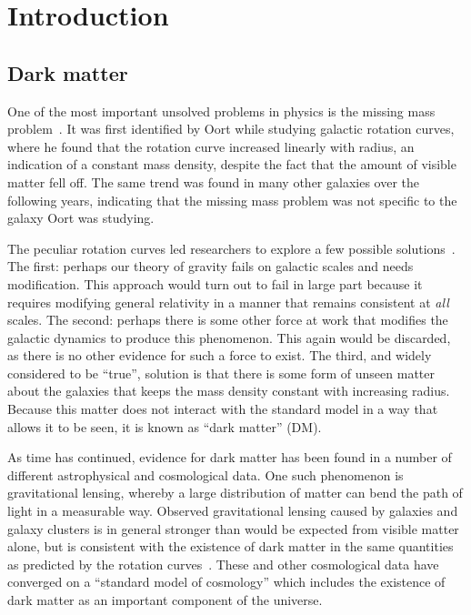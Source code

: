 \chapter{Introduction}
\label{sec:intro}

\section{Dark matter}
One of the most important unsolved problems in physics is the missing mass
problem~\cite{trimble_existence_1987}. It was first identified by Oort while studying galactic rotation
curves, where he found that the rotation curve increased linearly with
radius, an indication of a constant mass density, despite the fact that the
amount of visible matter fell off. The same trend was found in many other
galaxies over the following years, indicating that the missing mass problem
was not specific to the galaxy Oort was studying.

The peculiar rotation curves led researchers to explore a few possible
solutions~\cite{tucker_mystery_1984}. The first: perhaps our theory of
gravity fails on galactic scales and needs modification. This approach would
turn out to fail in large part because it requires modifying general
relativity in a manner that remains consistent at \textit{all} scales. The
second: perhaps there is some other force at work that modifies the galactic
dynamics to produce this phenomenon. This again would be discarded, as there
is no other evidence for such a force to exist. The third, and widely
considered to be ``true'', solution is that there is some form of unseen
matter about the galaxies that keeps the mass density constant with
increasing radius. Because this matter does not interact with the standard
model in a way that allows it to be seen, it is known as ``dark matter''
(DM).

As time has continued, evidence for dark matter has been found in a number of
different astrophysical and cosmological data. One such phenomenon is
gravitational lensing, whereby a large distribution of matter can bend the
path of light in a measurable way. Observed gravitational lensing caused by
galaxies and galaxy clusters is in general stronger than would be expected
from visible matter alone, but is consistent with the existence of dark
matter in the same quantities as predicted by the rotation
curves~\cite{schneider_gravitational_1992}. These and other cosmological data
have converged on a ``standard model of cosmology'' which includes the
existence of dark matter as an important component of the universe.

